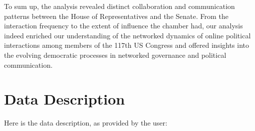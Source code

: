 \documentclass[11pt]{article}
\begin{document}
To sum up, the analysis revealed distinct collaboration and communication patterns between the House of Representatives and the Senate. From the interaction frequency to the extent of influence the chamber had, our analysis indeed enriched our understanding of the networked dynamics of online political interactions among members of the 117th US Congress and offered insights into the evolving democratic processes in networked governance and political communication.


\clearpage
\appendix

\section{Data Description} \label{sec:data_description} Here is the data description, as provided by the user:
\end{document}
